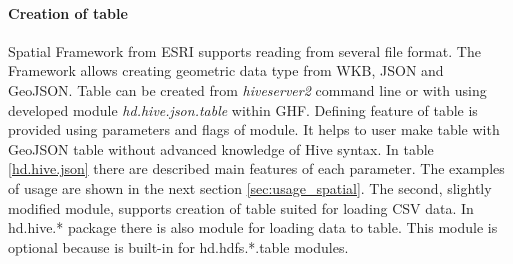 \documentclass[a4paper,12pt,oneside]{report}
\begin{document}
	
    \paragraph{Creation of table} Spatial Framework from ESRI supports reading  from
    several file format.  The Framework allows creating geometric data type from 
    WKB, JSON and GeoJSON. Table can be created from \textit{hiveserver2} command
    line or with using developed module  \textit{hd.hive.json.table} within GHF. 
    Defining feature of table is provided using parameters and flags of module. It helps
    to user make table with GeoJSON table without advanced knowledge of Hive
    syntax. In table \ref{hd.hive.json} there are described main features of each parameter.
    The examples of usage are shown in the next section \ref{sec:usage_spatial}.
    The second, slightly modified module, supports creation of table suited for loading
    CSV data. In hd.hive.* package there is also module for loading data to table. This
    module is optional because is built-in for hd.hdfs.*.table modules. 

	
	
\end{document}
